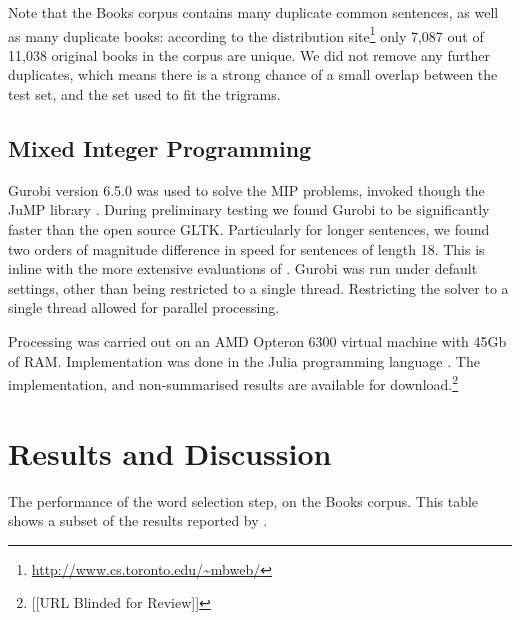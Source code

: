 \documentclass[11pt]{article}
\theoremstyle{plain}
\theoremstyle{definition}
\newcommand{\parencite}{\protect\cite}
\newcommand{\textcite}{\protect\newcite}
\begin{document}
Note that the Books corpus contains many duplicate common sentences, as well as many duplicate books: according to the distribution site\footnote{\url{http://www.cs.toronto.edu/~mbweb/}} only 7,087 out of 11,038 original books in the corpus are unique. We did not remove any further duplicates, which means there is a strong chance of a small overlap between the test set, and the set used to fit the trigrams.
 

\subsection{Mixed Integer Programming}
Gurobi version 6.5.0 was used to solve the MIP problems, invoked though the JuMP library \parencite{jump}. During preliminary testing we found Gurobi to be significantly faster than the open source GLTK. Particularly for longer sentences, we found two orders of magnitude difference in speed for sentences of length 18. This is inline with the more extensive evaluations of \textcite{meindl2012analysis}. Gurobi was run under default settings, other than being restricted to a single thread. Restricting the solver to a single thread allowed for parallel processing.

Processing was carried out on an AMD Opteron 6300 virtual machine with 45Gb of RAM. Implementation was done in the Julia programming language \parencite{Julia}. The implementation, and non-summarised results are available for download.\footnote{[[URL Blinded for Review]]}



\section{Results and Discussion} \label{results}


\begin{table}	
	\centering
	\caption{ The performance of the word selection step, on the Books corpus. This table shows a subset of the results reported by \textcite{White2015BOWgen}.}
	\label{table:wordselection}
\end{table}
\end{document}
